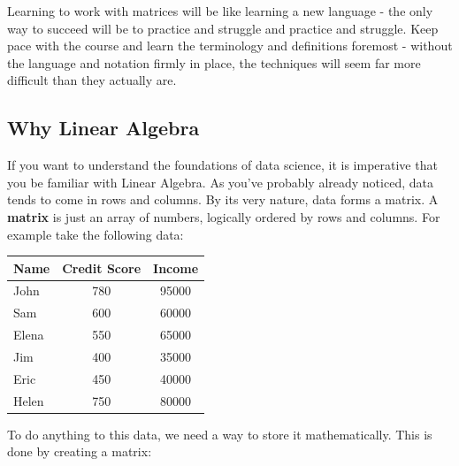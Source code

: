 \documentclass[
]{article}
\theoremstyle{definition}
\theoremstyle{definition}
\theoremstyle{definition}
\theoremstyle{definition}
\theoremstyle{remark}
\begin{document}
Learning to work with matrices will be like learning a new language - the only way to succeed will be to practice and struggle and practice and struggle. Keep pace with the course and learn the terminology and definitions foremost - without the language and notation firmly in place, the techniques will seem far more difficult than they actually are.

\hypertarget{why-linear-algebra}{%
\subsection{Why Linear Algebra}\label{why-linear-algebra}}

If you want to understand the foundations of data science, it is imperative that you be familiar with Linear Algebra. As you've probably already noticed, data tends to come in rows and columns. By its very nature, data forms a matrix. A \textbf{matrix} is just an array of numbers, logically ordered by rows and columns. For example take the following data:

\begin{center}
\begin{tabular}{l|c|c}
Name & Credit Score & Income\\
\hline
John & 780 & 95000\\
Sam & 600 & 60000\\
Elena & 550 & 65000\\
Jim & 400 & 35000\\
Eric & 450 & 40000\\
Helen & 750 & 80000
\end{tabular}
\end{center}

To do anything to this data, we need a way to store it mathematically. This is done by creating a matrix:

\end{document}
